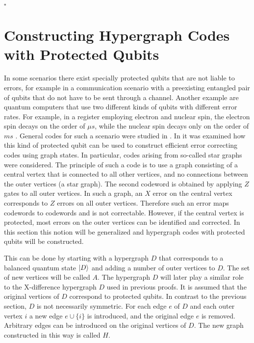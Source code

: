 \documentclass[12pt]{iopart}
\begin{document}
\begin{flushright}
$\square$
\end{flushright}

\section{Constructing Hypergraph Codes with Protected Qubits}

In some scenarios there exist specially protected qubits that are not liable to errors, for example in a communication scenario with a preexisting entangled pair of qubits that do not have to be sent through a channel. Another example are quantum computers that use two different kinds of qubits with different error rates. For example, in a register employing electron and nuclear spin, the electron spin decays on the order of $\mu s$, while the nuclear spin decays only on the order of $ms$ \cite{Decay}.
General codes for such a scenario were studied in \cite{EAQECCBrun}.
In \cite{EAQECC} it was examined how this kind of protected qubit can be used to construct efficient error correcting codes using graph states. In particular, codes arising from so-called star graphs were considered.
The principle of such a code is to use a graph consisting of a central vertex that is connected to all other vertices, and no connections between the outer vertices (a star graph). The second codeword is obtained by applying $Z$ gates to all outer vertices. In such a graph, an $X$ error on the central vertex corresponds to $Z$ errors on all outer vertices. Therefore such an error maps codewords to codewords and is not correctable. However, if the central vertex is protected, most errors on the outer vertices can be identified and corrected. 
In this section this notion will be generalized and hypergraph codes with protected qubits will be constructed.

This can be done by starting with a hypergraph $D$ that corresponds to a balanced quantum state $\ket{D}$ and adding a number of outer vertices to $D$. The set of new vertices will be called $A$. The hypergraph $D$ will later play a similar role to the X-difference hypergraph $D$ used in previous proofs.
It is assumed that the original vertices of $D$ correspond to protected qubits. In contrast to the previous section, $D$ is not necessarily symmetric. For each edge $e$ of $D$ and each outer vertex $i$ a new edge $e \cup \{i\}$ is introduced, and the original edge $e$ is removed. Arbitrary edges can be introduced on the original vertices of $D$. The new graph constructed in this way is called $H$.
\end{document}
